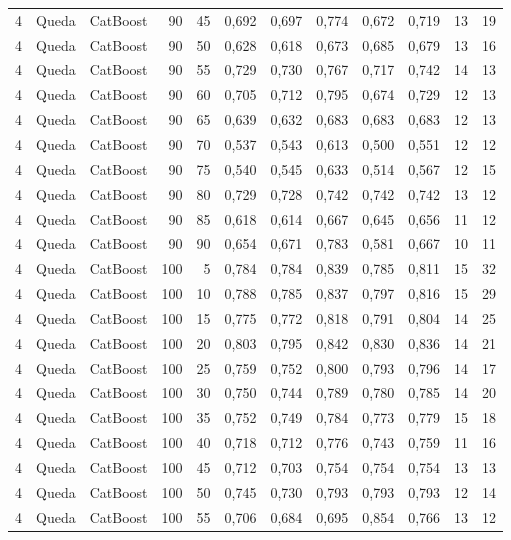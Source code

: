 \begin{longtable}{@{}rllrrrrrrrrr@{}}
4 & Queda & CatBoost & 90 & 45 & 0,692 & 0,697 & 0,774 & 0,672 & 0,719 & 13 & 19 \\
4 & Queda & CatBoost & 90 & 50 & 0,628 & 0,618 & 0,673 & 0,685 & 0,679 & 13 & 16 \\
4 & Queda & CatBoost & 90 & 55 & 0,729 & 0,730 & 0,767 & 0,717 & 0,742 & 14 & 13 \\
4 & Queda & CatBoost & 90 & 60 & 0,705 & 0,712 & 0,795 & 0,674 & 0,729 & 12 & 13 \\
4 & Queda & CatBoost & 90 & 65 & 0,639 & 0,632 & 0,683 & 0,683 & 0,683 & 12 & 13 \\
4 & Queda & CatBoost & 90 & 70 & 0,537 & 0,543 & 0,613 & 0,500 & 0,551 & 12 & 12 \\
4 & Queda & CatBoost & 90 & 75 & 0,540 & 0,545 & 0,633 & 0,514 & 0,567 & 12 & 15 \\
4 & Queda & CatBoost & 90 & 80 & 0,729 & 0,728 & 0,742 & 0,742 & 0,742 & 13 & 12 \\
4 & Queda & CatBoost & 90 & 85 & 0,618 & 0,614 & 0,667 & 0,645 & 0,656 & 11 & 12 \\
4 & Queda & CatBoost & 90 & 90 & 0,654 & 0,671 & 0,783 & 0,581 & 0,667 & 10 & 11 \\
4 & Queda & CatBoost & 100 & 5 & 0,784 & 0,784 & 0,839 & 0,785 & 0,811 & 15 & 32 \\
4 & Queda & CatBoost & 100 & 10 & 0,788 & 0,785 & 0,837 & 0,797 & 0,816 & 15 & 29 \\
4 & Queda & CatBoost & 100 & 15 & 0,775 & 0,772 & 0,818 & 0,791 & 0,804 & 14 & 25 \\
4 & Queda & CatBoost & 100 & 20 & 0,803 & 0,795 & 0,842 & 0,830 & 0,836 & 14 & 21 \\
4 & Queda & CatBoost & 100 & 25 & 0,759 & 0,752 & 0,800 & 0,793 & 0,796 & 14 & 17 \\
4 & Queda & CatBoost & 100 & 30 & 0,750 & 0,744 & 0,789 & 0,780 & 0,785 & 14 & 20 \\
4 & Queda & CatBoost & 100 & 35 & 0,752 & 0,749 & 0,784 & 0,773 & 0,779 & 15 & 18 \\
4 & Queda & CatBoost & 100 & 40 & 0,718 & 0,712 & 0,776 & 0,743 & 0,759 & 11 & 16 \\
4 & Queda & CatBoost & 100 & 45 & 0,712 & 0,703 & 0,754 & 0,754 & 0,754 & 13 & 13 \\
4 & Queda & CatBoost & 100 & 50 & 0,745 & 0,730 & 0,793 & 0,793 & 0,793 & 12 & 14 \\
4 & Queda & CatBoost & 100 & 55 & 0,706 & 0,684 & 0,695 & 0,854 & 0,766 & 13 & 12 \\

\end{longtable}
